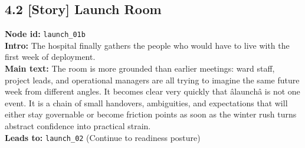 \documentclass[11pt]{article}
\begin{document}
\subsection*{4.2 [Story] Launch Room}
\textbf{Node id:} \texttt{launch\_01b}\\
\textbf{Intro:} The hospital finally gathers the people who would have to live with the first week of deployment.\\
\textbf{Main text:} The room is more grounded than earlier meetings: ward staff, project leads, and operational managers are all trying to imagine the same future week from different angles. It becomes clear very quickly that âlaunchâ is not one event. It is a chain of small handovers, ambiguities, and expectations that will either stay governable or become friction points as soon as the winter rush turns abstract confidence into practical strain.\\
\textbf{Leads to:} \texttt{launch\_02} (Continue to readiness posture)\\
\end{document}
